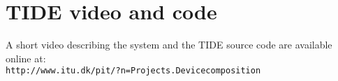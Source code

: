 \appendix
\chapter{TIDE video and code}
\label{video}

A short video describing the system and the TIDE source code are available online at:\\
\linebreak
\texttt{http://www.itu.dk/pit/?n=Projects.Devicecomposition}


